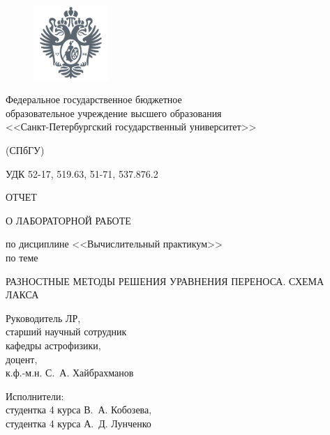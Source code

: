 \documentclass[12pt,a4paper]{article}
\begin{document}
	
	\thispagestyle{empty}
	
	\begin{figure}
		\centering
		\includegraphics[width=80pt]{figures/spbu_grey.png}
	\end{figure}
	
	\begin{center}
		Федеральное государственное бюджетное \\образовательное учреждение высшего образования \\<<Санкт-Петербургский государственный университет>>
		
		(СПбГУ)
	\end{center}
	
	\vspace{1em}
	УДК 52-17, 519.63, 51-71, 537.876.2
	
	\vspace{5em}
	\begin{center}
		ОТЧЕТ
		
		О ЛАБОРАТОРНОЙ РАБОТЕ
		
		\vspace{2em}
		по дисциплине <<Вычислительный практикум>> \\ по теме
		
		РАЗНОСТНЫЕ МЕТОДЫ РЕШЕНИЯ УРАВНЕНИЯ ПЕРЕНОСА. СХЕМА ЛАКСА
	\end{center}
	
	\vspace{14em}
	\begin{flushleft}
		Руководитель ЛР,\\
		старший научный сотрудник\\
		кафедры астрофизики,\\
		доцент,\\
		к.ф.-м.н. С.~А. Хайбрахманов
	\end{flushleft}
	
	\vspace{1em}
	\begin{flushright}
		Исполнители:\\
		студентка 4 курса В.~А. Кобозева,\\
		студентка 4 курса А.~Д. Лунченко
	\end{flushright}
	
\end{document}
